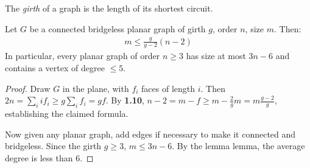 \documentclass[10pt,a4paper]{article}
\begin{document}
The \emph{girth} of a graph is the length of its shortest circuit.

\begin{theorem}
Let $G$ be a connected bridgeless planar graph of girth $g$, order $n$, size $m$. Then:
\begin{align*}
m\leq \frac{g}{g-2}(n-2)
\end{align*}
In particular, every planar graph of order $n\geq 3$ has size at most $3n-6$ and contains a vertex of degree $\leq 5$.
\end{theorem}
\begin{proof}
Draw $G$ in the plane, with $f_i$ faces of length $i$. Then $2n = \sum_i if_i \geq g\sum_i f_i = gf$. By \textbf{1.10}, $n-2=m-f \geq m-\frac{2}{g}m = m\frac{g-2}{g}$, establishing the claimed formula.

Now given any planar graph, add edges if necessary to make it connected and bridgeless. Since the girth $g\geq 3$, $m\leq 3n-6$. By the lemma lemma, the average degree is less than 6.
\end{proof}
\end{document}
